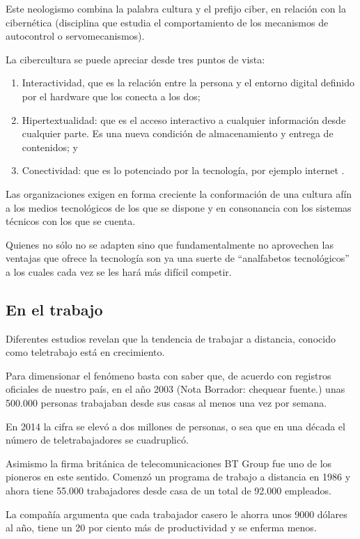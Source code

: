 \documentclass[a4paper, 12pt]{article}
\begin{document}
Este neologismo combina la palabra cultura y el prefijo ciber, en relación con la cibernética (disciplina que estudia el comportamiento de los mecanismos de autocontrol o servomecanismos).

La cibercultura se puede apreciar desde tres puntos de vista:

\begin{enumerate}
\item Interactividad, que es la relación entre la persona y el entorno digital definido por el hardware que los conecta a los dos;
\item Hipertextualidad: que es el acceso interactivo a cualquier información desde cualquier parte. Es una nueva condición de almacenamiento y entrega de contenidos; y
\item Conectividad: que es lo potenciado por la tecnología, por ejemplo internet .
\end{enumerate}

Las organizaciones exigen en forma creciente la conformación de una cultura afín a los medios tecnológicos de los que se dispone y en consonancia con los sistemas técnicos con los que se cuenta. 

Quienes no sólo no se adapten sino que fundamentalmente no aprovechen las ventajas que ofrece la tecnología son ya una suerte de “analfabetos tecnológicos” a los cuales cada vez se les hará más difícil competir.

\subsection{En el trabajo}

Diferentes estudios revelan que la tendencia de trabajar a distancia, conocido como teletrabajo está en crecimiento. 

Para dimensionar el fenómeno basta con saber que, de acuerdo con registros oficiales de nuestro país, en el año 2003 (Nota Borrador: chequear fuente.) unas 500.000 personas trabajaban desde sus casas al menos una vez por semana. 

En 2014 la cifra se elevó a dos millones de personas, o sea que en una década el número de teletrabajadores se cuadruplicó.

Asimismo la firma británica de telecomunicaciones BT Group fue uno de los pioneros en este sentido. Comenzó un programa de trabajo a distancia en 1986 y ahora tiene 55.000 trabajadores desde casa de un total de 92.000 empleados.

La compañía argumenta que cada trabajador casero le ahorra unos 9000 dólares al año, tiene un 20 por ciento más de productividad y se enferma menos.
\end{document}
